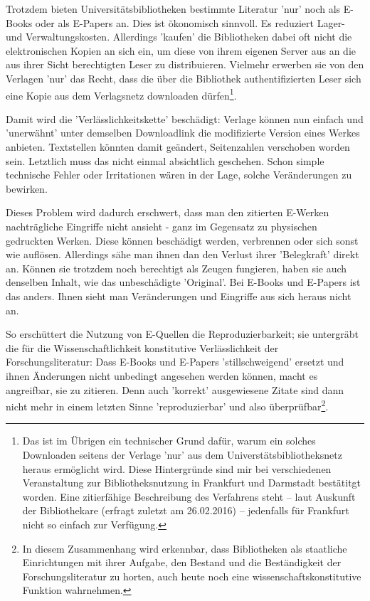 Trotzdem bieten Universitätsbibliotheken bestimmte Literatur 'nur' noch als
E-Books oder als E-Papers an. Dies ist ökonomisch sinnvoll. Es reduziert Lager-
und Verwaltungskosten. Allerdings 'kaufen' die Bibliotheken dabei oft nicht die
elektronischen Kopien an sich ein, um diese von ihrem eigenen Server aus an die
aus ihrer Sicht berechtigten Leser zu distribuieren. Vielmehr erwerben sie von
den Verlagen 'nur' das Recht, dass die über die Bibliothek authentifizierten
Leser sich eine Kopie aus dem Verlagsnetz downloaden dürfen\footnote{ Das ist im
Übrigen ein technischer Grund dafür, warum ein solches Downloaden seitens der
Verlage 'nur' aus dem Universtätsbibliotheksnetz heraus ermöglicht wird. Diese
Hintergründe sind mir bei verschiedenen Veranstaltung zur Bibliotheksnutzung in
Frankfurt und Darmstadt bestätitgt worden. Eine zitierfähige Beschreibung des
Verfahrens steht -- laut Auskunft der Bibliothekare (erfragt zuletzt am
26.02.2016) -- jedenfalls für Frankfurt nicht so einfach zur Verfügung.}.

Damit wird die 'Verlässlichkeitskette' beschädigt: Verlage können nun einfach
und 'unerwähnt' unter demselben Downloadlink die modifizierte Version eines
Werkes anbieten. Textstellen könnten damit geändert, Seitenzahlen verschoben
worden sein. Letztlich muss das nicht einmal absichtlich geschehen.
Schon simple technische Fehler oder Irritationen wären in der Lage, solche
Veränderungen zu bewirken.

Dieses Problem wird dadurch erschwert, dass man den zitierten E-Werken
nachträgliche Eingriffe nicht ansieht - ganz im Gegensatz zu physischen
gedruckten Werken. Diese können beschädigt werden, verbrennen oder sich sonst
wie auflösen. Allerdings sähe man ihnen dan den Verlust ihrer 'Belegkraft'
direkt an. Können sie trotzdem noch berechtigt als Zeugen fungieren, haben sie
auch denselben Inhalt, wie das unbeschädigte 'Original'. Bei E-Books und
E-Papers ist das anders. Ihnen sieht man Veränderungen und Eingriffe aus sich
heraus nicht an.

So erschüttert die Nutzung von E-Quellen die Reproduzierbarkeit; sie untergräbt
die für die Wissenschaftlichkeit konstitutive Verlässlichkeit der
Forschungsliteratur: Dass E-Books und E-Papers 'stillschweigend' ersetzt und
ihnen Änderungen nicht unbedingt angesehen werden können, macht es angreifbar,
sie zu zitieren. Denn auch 'korrekt' ausgewiesene Zitate sind dann nicht mehr in
einem letzten Sinne 'reproduzierbar' und also überprüfbar\footnote{In diesem
Zusammenhang wird erkennbar, dass Bibliotheken als staatliche Einrichtungen mit
ihrer Aufgabe, den Bestand und die Beständigkeit der Forschungsliteratur zu
horten, auch heute noch eine wissenschaftskonstitutive Funktion wahrnehmen.}.

